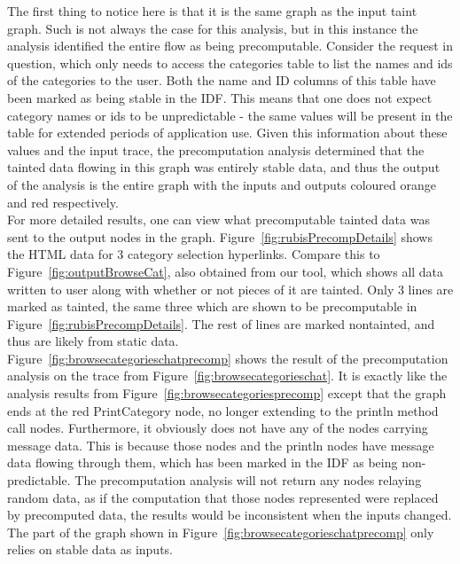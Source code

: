 \documentclass[msc,oneside]{ubcthesis}
\begin{document}
The first thing to notice here is that it is the same graph as the input taint graph. Such is not always the case for this analysis, but in this instance the analysis identified the entire flow as being precomputable. Consider the request in question, which only needs to access the categories table to list the names and ids of the categories to the user. Both the name and ID columns of this table have been marked as being stable in the IDF. This means that one does not expect category names or ids to be unpredictable - the same values will be present in the table for extended periods of application use. Given this information about these values and the input trace, the precomputation analysis determined that the tainted data flowing in this graph was entirely stable data, and thus the output of the analysis is the entire graph with the inputs and outputs coloured orange and red respectively.\\

For more detailed results, one can view what precomputable tainted data was sent to the output nodes in the graph. Figure~\ref{fig:rubisPrecompDetails} shows the HTML data for 3 category selection hyperlinks. Compare this to Figure~\ref{fig:outputBrowseCat}, also obtained from our tool, which shows all data written to user along with whether or not pieces of it are tainted. Only 3 lines are marked as tainted, the same three which are shown to be precomputable in Figure~\ref{fig:rubisPrecompDetails}. The rest of lines are marked nontainted, and thus are likely from static data. \\

Figure~\ref{fig:browsecategorieschatprecomp} shows the result of the precomputation analysis on the trace from Figure~\ref{fig:browsecategorieschat}. It is exactly like the analysis results from Figure~\ref{fig:browsecategoriesprecomp} except that the graph ends at the red PrintCategory node, no longer extending to the println method call nodes. Furthermore, it obviously does not have any of the nodes carrying message data. This is because those nodes and the println nodes have message data flowing through them, which has been marked in the IDF as being non-predictable. The precomputation analysis will not return any nodes relaying random data, as if the computation that those nodes represented were replaced by precomputed data, the results would be inconsistent when the inputs changed. The part of the graph shown in Figure~\ref{fig:browsecategorieschatprecomp} only relies on stable data as inputs.\\
\end{document}
